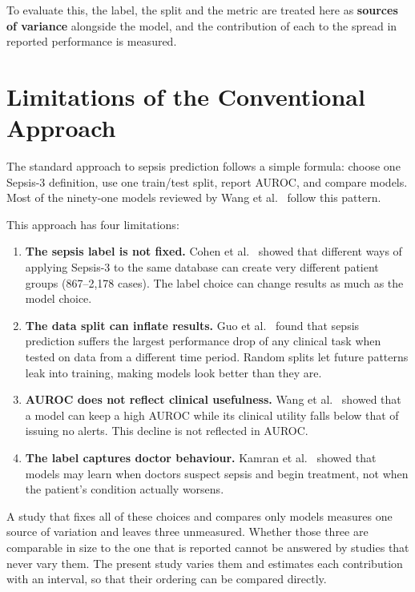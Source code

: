 To evaluate this, the label, the split and the metric are treated here as
\textbf{sources of variance} alongside the model, and the contribution of each
to the spread in reported performance is measured.


\section{Limitations of the Conventional Approach}

The standard approach to sepsis prediction follows a simple formula: choose one
Sepsis-3 definition, use one train/test split, report AUROC, and compare models.
Most of the ninety-one models reviewed by Wang et al.\ \cite{wang2025srpm}
follow this pattern.

This approach has four limitations:

\begin{enumerate}
    \item \textbf{The sepsis label is not fixed.} Cohen et al.\
    \cite{cohen2024subtle} showed that different ways of applying Sepsis-3 to
    the same database can create very different patient groups (867--2,178 cases).
    The label choice can change results as much as the model choice.

    \item \textbf{The data split can inflate results.} Guo et al.\
    \cite{guo2022temporal} found that sepsis prediction suffers the largest
    performance drop of any clinical task when tested on data from a different time
    period. Random splits let future patterns leak into training, making models
    look better than they are.

    \item \textbf{AUROC does not reflect clinical usefulness.} Wang et al.\
    \cite{wang2025srpm} showed that a model can keep a high AUROC while its
    clinical utility falls below that of issuing no alerts. This decline is not
    reflected in AUROC.

    \item \textbf{The label captures doctor behaviour.} Kamran et al.\
    \cite{kamran2024evaluation} showed that models may learn when doctors
    suspect sepsis and begin treatment, not when the patient's condition actually
    worsens.
\end{enumerate}

A study that fixes all of these choices and compares only models measures one
source of variation and leaves three unmeasured. Whether those three are
comparable in size to the one that is reported cannot be answered by studies
that never vary them. The present study varies them and estimates each
contribution with an interval, so that their ordering can be compared
directly.


